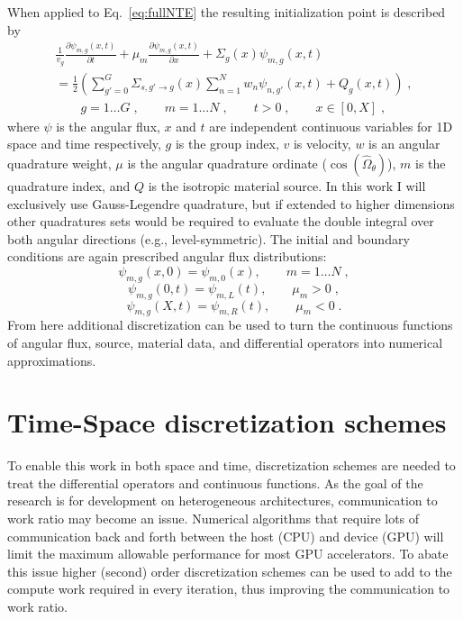 When applied to Eq.~\eqref{eq:fullNTE} the resulting initialization point is described by
\begin{multline}
    \label{sn_nte_int}
    \frac{1}{v_g} \frac{\partial \psi_{m,g}(x,t)}{\partial t} + \mu_m \frac{\partial \psi_{m,g}(x,t)}{\partial x} + \Sigma_g(x) \psi_{m,g}(x,t)  \\
     = \frac{1}{2} \left( \sum\limits_{g' = 0}^G \Sigma_{s, g'\to g}(x) \sum\limits_{n=1}^N w_n \psi_{n, g'}(x,t) + Q_g(x,t) \right) \;, \\
    \qquad g=1 \ldots G \;, \qquad m=1 \ldots N \;, \qquad t > 0 \;, \qquad x \in [0,X] \;,
\end{multline}
where $\psi$ is the angular flux, $x$ and $t$ are independent continuous variables for 1D space and time respectively, $g$ is the group index, $v$ is velocity, $w$ is an angular quadrature weight, $\mu$ is the angular quadrature ordinate ($\cos(\hat{\Omega}_\theta)$), $m$ is the quadrature index, and $Q$ is the isotropic material source.
In this work I will exclusively use Gauss-Legendre quadrature, but if extended to higher dimensions other quadratures sets would be required to evaluate the double integral over both angular directions (e.g., level-symmetric). 
The initial and boundary conditions are again prescribed angular flux distributions:
\begin{equation*}
    \psi_{m,g}(x,0) = \psi_{m,0}(x), \qquad m=1 \ldots N \;,
\end{equation*}
\begin{equation*}
    \psi_{m,g}(0,t) = \psi_{m,L}(t), \qquad \mu_m >0 \;,
\end{equation*}
\begin{equation*}
    \psi_{m,g}(X,t) = \psi_{m,R}(t), \qquad \mu_m <0 \;.
\end{equation*}
From here additional discretization can be used to turn the continuous functions of angular flux, source, material data, and differential operators into numerical approximations.

\section{Time-Space discretization schemes}

To enable this work in both space and time, discretization schemes are needed to treat the differential operators and continuous functions.
As the goal of the research is for development on heterogeneous architectures, communication to work ratio may become an issue.
Numerical algorithms that require lots of communication back and forth between the host (CPU) and device (GPU) will limit the maximum allowable performance for most GPU accelerators.
To abate this issue higher (second) order discretization schemes can be used to add to the compute work required in every iteration, thus improving the communication to work ratio.

